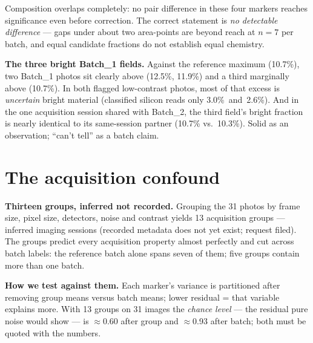 \documentclass[10pt,a4paper]{article}
\begin{document}
Composition overlaps completely: no pair difference in these four
markers reaches significance even before correction. The correct
statement is \emph{no detectable difference} --- gaps under about two
area-points are beyond reach at $n=7$ per batch, and equal candidate
fractions do not establish equal chemistry.

\textbf{The three bright Batch\_1 fields.} Against the reference
maximum (10.7\%), two Batch\_1 photos sit
clearly above (12.5\%, 11.9\%) and a third marginally
above (10.7\%). In both flagged low-contrast
photos, most of that excess is \emph{uncertain} bright material
(classified silicon reads only 3.0\%\ and\ 2.6\%).
And in the one acquisition session shared with Batch\_2,
the third field's bright fraction is nearly identical to its
same-session partner (10.7\% vs.\ 10.3\%). Solid as an observation;
``can't tell'' as a batch claim.

\section{The acquisition confound}
\label{sec:acq}

\textbf{Thirteen groups, inferred not recorded.} Grouping the 31 photos
by frame size, pixel size, detectors, noise and contrast yields 13
acquisition groups --- inferred imaging sessions (recorded metadata does
not yet exist; request filed). The groups predict every acquisition
property almost perfectly and cut across batch labels: the reference
batch alone spans seven of them; five groups contain more than one batch.

\textbf{How we test against them.} Each marker's variance is partitioned
after removing group means versus batch means; lower residual = that
variable explains more. With 13 groups on 31 images the \emph{chance
level} --- the residual pure noise would show --- is
$\approx$0.60 after group and
$\approx$0.93 after batch;
both must be quoted with the numbers.
\end{document}

